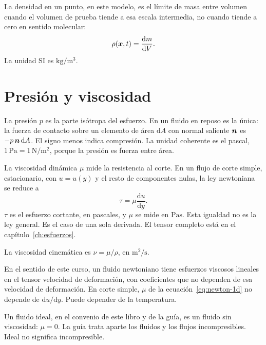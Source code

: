 La densidad en un punto, en este modelo, es el límite de masa entre volumen cuando el volumen de prueba tiende a esa escala intermedia, no cuando tiende a cero en sentido molecular:
\begin{equation}
\label{eq:densidad}
\rho(\boldsymbol{x},t)=\frac{\mathrm{d}m}{\mathrm{d}V}.
\end{equation}
La unidad SI es \(\si{\kilogram\per\cubic\metre}\).

\section{Presión y viscosidad}

La presión \(p\) es la parte isótropa del esfuerzo. En un fluido en reposo es la única: la fuerza de contacto sobre un elemento de área \(\mathrm{d}A\) con normal saliente \(\boldsymbol{n}\) es \(-p\,\boldsymbol{n}\,\mathrm{d}A\). El signo menos indica compresión. La unidad coherente es el pascal, \(1\,\si{\pascal}=1\,\si{\newton\per\square\metre}\), porque la presión es fuerza entre área.

La viscosidad dinámica \(\mu\) mide la resistencia al corte. En un flujo de corte simple, estacionario, con \(u=u(y)\) y el resto de componentes nulas, la ley newtoniana se reduce a
\begin{equation}
\label{eq:newton-1d}
\tau=\mu\frac{\mathrm{d}u}{\mathrm{d}y}.
\end{equation}
\(\tau\) es el esfuerzo cortante, en pascales, y \(\mu\) se mide en \(\si{\pascal\second}\). Esta igualdad no es la ley general. Es el caso de una sola derivada. El tensor completo está en el capítulo~\ref{ch:esfuerzos}.

La viscosidad cinemática es \(\nu=\mu/\rho\), en \(\si{\square\metre\per\second}\).

\begin{definitionbox}
En el sentido de este curso, un fluido newtoniano tiene esfuerzos viscosos lineales en el tensor velocidad de deformación, con coeficientes que no dependen de esa velocidad de deformación. En corte simple, \(\mu\) de la ecuación~\eqref{eq:newton-1d} no depende de \(\mathrm{d}u/\mathrm{d}y\). Puede depender de la temperatura.
\end{definitionbox}

Un fluido ideal, en el convenio de este libro y de la guía, es un fluido sin viscosidad: \(\mu=0\). La guía trata aparte los fluidos y los flujos incompresibles. Ideal no significa incompresible.

